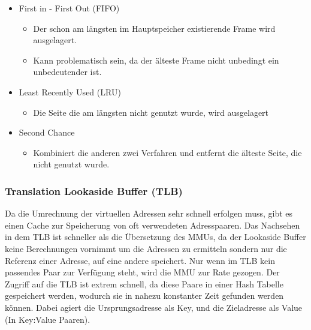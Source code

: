 \documentclass{article}
\begin{document}
	\begin{itemize}
		\item{First in - First Out (FIFO)}
		\begin{itemize}
			\item{Der schon am längsten im Hauptspeicher existierende Frame wird ausgelagert.}
			\item{Kann problematisch sein, da der älteste Frame nicht unbedingt ein unbedeutender ist.}
		\end{itemize}
		\item{Least Recently Used (LRU)}
		\begin{itemize}
			\item{Die Seite die am längsten nicht genutzt wurde, wird ausgelagert}
		\end{itemize}
		\item{Second Chance}
		\begin{itemize}
			\item{Kombiniert die anderen zwei Verfahren und entfernt die älteste Seite, die nicht genutzt wurde.}
		\end{itemize}
	\end{itemize}
	\subsubsection{Translation Lookaside Buffer (TLB)}
	Da die Umrechnung der virtuellen Adressen sehr schnell erfolgen muss, gibt es einen Cache zur Speicherung von oft verwendeten Adresspaaren. Das Nachsehen in dem TLB ist schneller als die Übersetzung des MMUs, da der Lookaside Buffer keine Berechnungen vornimmt um die Adressen zu ermitteln sondern nur die Referenz einer Adresse, auf eine andere speichert. Nur wenn im TLB kein passendes Paar zur Verfügung steht, wird die MMU zur Rate gezogen. Der Zugriff auf die TLB ist extrem schnell, da diese Paare in einer Hash Tabelle gespeichert werden, wodurch sie in nahezu konstanter Zeit gefunden werden können. Dabei agiert die Ursprungsadresse als Key, und die Zieladresse als Value (In Key:Value Paaren).
\end{document}
